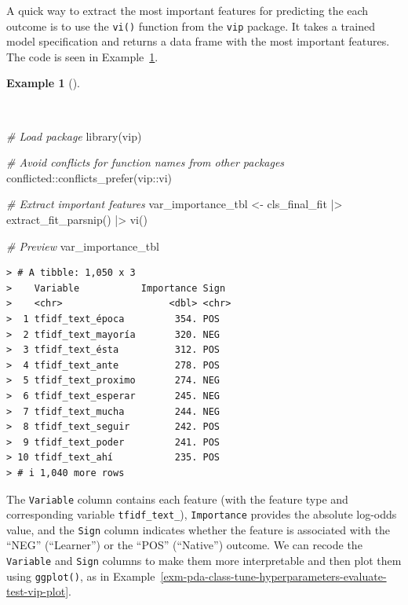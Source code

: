 \documentclass[
  letterpaper,
]{latex/krantz}
\newenvironment{Shaded}{\begin{snugshade}}{\end{snugshade}}
\newcommand{\CommentTok}[1]{\textcolor[rgb]{0.00,0.00,0.00}{\textit{#1}}}
\newcommand{\FunctionTok}[1]{\textcolor[rgb]{0.00,0.00,0.00}{#1}}
\newcommand{\NormalTok}[1]{\textcolor[rgb]{0.00,0.00,0.00}{#1}}
\newcommand{\OtherTok}[1]{\textcolor[rgb]{0.00,0.00,0.00}{#1}}
\newcommand{\SpecialCharTok}[1]{\textcolor[rgb]{0.00,0.00,0.00}{#1}}
\theoremstyle{definition}
\newtheorem{example}{Example}[chapter]
\theoremstyle{remark}
\begin{document}
A quick way to extract the most important features for predicting the
each outcome is to use the \texttt{vi()} function from the \texttt{vip}
package. It takes a trained model specification and returns a data frame
with the most important features. The code is seen in
Example~\ref{exm-pda-class-tune-hyperparameters-evaluate-test-vip}.

\begin{example}[]\protect\hypertarget{exm-pda-class-tune-hyperparameters-evaluate-test-vip}{}\label{exm-pda-class-tune-hyperparameters-evaluate-test-vip}

~

\begin{Shaded}
\begin{Highlighting}[]
\CommentTok{\# Load package}
\FunctionTok{library}\NormalTok{(vip)}

\CommentTok{\# Avoid conflicts for function names from other packages}
\NormalTok{conflicted}\SpecialCharTok{::}\FunctionTok{conflicts\_prefer}\NormalTok{(vip}\SpecialCharTok{::}\NormalTok{vi)}

\CommentTok{\# Extract important features}
\NormalTok{var\_importance\_tbl }\OtherTok{\textless{}{-}}
\NormalTok{  cls\_final\_fit }\SpecialCharTok{|\textgreater{}}
  \FunctionTok{extract\_fit\_parsnip}\NormalTok{() }\SpecialCharTok{|\textgreater{}}
  \FunctionTok{vi}\NormalTok{()}

\CommentTok{\# Preview}
\NormalTok{var\_importance\_tbl}
\end{Highlighting}
\end{Shaded}

\begin{verbatim}
> # A tibble: 1,050 x 3
>    Variable           Importance Sign 
>    <chr>                   <dbl> <chr>
>  1 tfidf_text_época         354. POS  
>  2 tfidf_text_mayoría       320. NEG  
>  3 tfidf_text_ésta          312. POS  
>  4 tfidf_text_ante          278. POS  
>  5 tfidf_text_proximo       274. NEG  
>  6 tfidf_text_esperar       245. NEG  
>  7 tfidf_text_mucha         244. NEG  
>  8 tfidf_text_seguir        242. POS  
>  9 tfidf_text_poder         241. POS  
> 10 tfidf_text_ahí           235. POS  
> # i 1,040 more rows
\end{verbatim}

\end{example}

The \texttt{Variable} column contains each feature (with the feature
type and corresponding variable \texttt{tfidf\_text\_}),
\texttt{Importance} provides the absolute log-odds value, and the
\texttt{Sign} column indicates whether the feature is associated with
the ``NEG'' (``Learner'') or the ``POS'' (``Native'') outcome. We can
recode the \texttt{Variable} and \texttt{Sign} columns to make them more
interpretable and then plot them using \texttt{ggplot()}, as in
Example~\ref{exm-pda-class-tune-hyperparameters-evaluate-test-vip-plot}.
\end{document}

